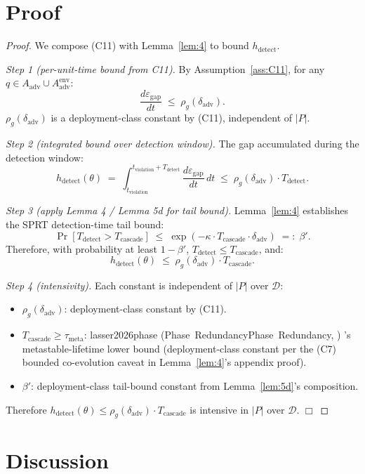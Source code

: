 \documentclass{article}
\makeatletter
\newcommand{\citep}[2][]{%
  \begingroup
  \def\@tmpkey{#2}%
  \ifx\@tmpkey\@empty\else
    (\ifx\@empty#1\@empty\else #1, \fi
     \@nameuse{bibkey@\@tmpkey})%
  \fi
  \endgroup
}
\newcommand{\Aadv}{A_{\mathrm{adv}}}
\newcommand{\deltaadv}{\delta_{\mathrm{adv}}}
\newcommand{\epsgap}{\varepsilon_{\mathrm{gap}}}
\makeatother
\begin{document}
\section{Proof}

\begin{proof}
We compose (C11) with Lemma~\ref{lem:4} to bound
$h_{\mathrm{detect}}$.

\emph{Step 1 (per-unit-time bound from C11).}  By
Assumption~\ref{ass:C11}, for any $q \in \Aadv \cup
\Aadv^{\mathrm{env}}$:
\[
  \frac{d \epsgap}{dt} \;\leq\; \rho_g(\deltaadv).
\]
$\rho_g(\deltaadv)$ is a deployment-class constant by (C11),
independent of $|P|$.

\emph{Step 2 (integrated bound over detection window).}  The gap
accumulated during the detection window:
\[
  h_{\mathrm{detect}}(\theta) \;=\;
  \int_{t_{\mathrm{violation}}}^{t_{\mathrm{violation}} +
  T_{\mathrm{detect}}} \frac{d \epsgap}{dt} \, dt
  \;\leq\; \rho_g(\deltaadv) \cdot T_{\mathrm{detect}}.
\]

\emph{Step 3 (apply Lemma 4 / Lemma 5d for tail bound).}
Lemma~\ref{lem:4} establishes the SPRT detection-time tail bound:
\[
  \Pr[T_{\mathrm{detect}} > T_{\mathrm{cascade}}] \;\leq\;
  \exp(-\kappa \cdot T_{\mathrm{cascade}} \cdot \deltaadv) \;=:\;
  \beta'.
\]
Therefore, with probability at least $1 - \beta'$,
$T_{\mathrm{detect}} \leq T_{\mathrm{cascade}}$, and:
\[
  h_{\mathrm{detect}}(\theta) \;\leq\; \rho_g(\deltaadv) \cdot
  T_{\mathrm{cascade}}.
\]

\emph{Step 4 (intensivity).}  Each constant is independent of
$|P|$ over $\mathcal{D}$:
\begin{itemize}
\item $\rho_g(\deltaadv)$: deployment-class constant by (C11).
\item $T_{\mathrm{cascade}} \geq \tau_{\mathrm{meta}}$:
  \citep[Phase~Redundancy]{lasser2026phase}'s metastable-lifetime
  lower bound (deployment-class constant per the (C7) bounded
  co-evolution caveat in Lemma~\ref{lem:4}'s appendix proof).
\item $\beta'$: deployment-class tail-bound constant from
  Lemma~\ref{lem:5d}'s composition.
\end{itemize}
Therefore $h_{\mathrm{detect}}(\theta) \leq \rho_g(\deltaadv) \cdot
T_{\mathrm{cascade}}$ is intensive in $|P|$ over $\mathcal{D}$.
$\Box$
\end{proof}

\section{Discussion}
\end{document}
